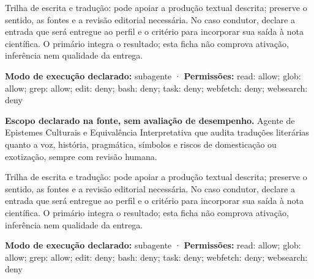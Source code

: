 \begin{funcao}
Trilha de escrita e tradução: pode apoiar a produção textual descrita; preserve o sentido, as fontes e a revisão editorial necessária. No caso condutor, declare a entrada que será entregue ao perfil e o critério para incorporar sua saída à nota científica. O primário integra o resultado; esta ficha não comprova ativação, inferência nem qualidade da entrega.
\end{funcao}

\begin{arquitetura}
\textbf{Modo de execução declarado:} subagente · \textbf{Permissões:} read: allow; glob: allow; grep: allow; edit: deny; bash: deny; task: deny; webfetch: deny; websearch: deny
\end{arquitetura}


\begin{descricao}
\textbf{Escopo declarado na fonte, sem avaliação de desempenho.}
Agente de Epistemes Culturais e Equivalência Interpretativa que audita traduções literárias quanto a voz, história, pragmática, símbolos e riscos de domesticação ou exotização, sempre com revisão humana.
\end{descricao}

\begin{funcao}
Trilha de escrita e tradução: pode apoiar a produção textual descrita; preserve o sentido, as fontes e a revisão editorial necessária. No caso condutor, declare a entrada que será entregue ao perfil e o critério para incorporar sua saída à nota científica. O primário integra o resultado; esta ficha não comprova ativação, inferência nem qualidade da entrega.
\end{funcao}

\begin{arquitetura}
\textbf{Modo de execução declarado:} subagente · \textbf{Permissões:} read: allow; glob: allow; grep: allow; edit: deny; bash: deny; task: deny; webfetch: deny; websearch: deny
\end{arquitetura}


